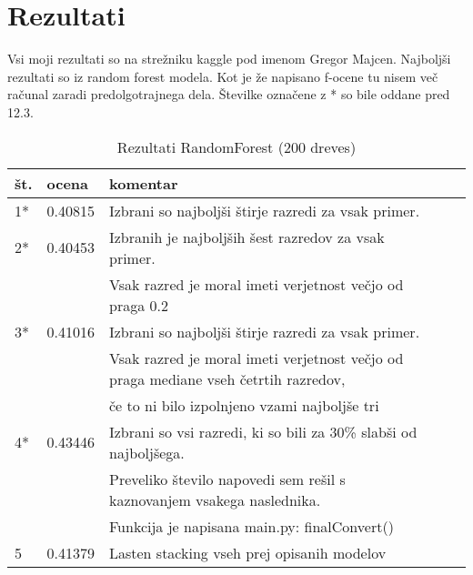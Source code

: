 \documentclass[a4paper,11pt]{article}
\begin{document}
\section{Rezultati}
Vsi moji rezultati so na strežniku kaggle pod imenom Gregor Majcen. Najboljši rezultati so iz random forest modela. Kot je že napisano f-ocene tu nisem več računal zaradi predolgotrajnega dela. Številke označene z * so bile oddane pred 12.3.
\begin{table}[htbp]
\caption{Rezultati RandomForest (200 dreves)}
\label{tab1}
\begin{center}
\begin{tabular}{llllp{10cm}}
\v{s}t. & {ocena} & komentar \\
\hline
1* & 0.40815 & Izbrani so najboljši štirje razredi za vsak primer.\\
2* & 0.40453 & Izbranih je najboljših šest razredov za vsak primer.\\&& Vsak razred je moral imeti verjetnost večjo od praga 0.2\\
3* & 0.41016 & Izbrani so najboljši štirje razredi za vsak primer. \\&& Vsak razred je moral imeti verjetnost večjo od praga mediane vseh četrtih razredov, \\&& če to ni bilo izpolnjeno vzami najboljše tri\\ 
4* & 0.43446 & Izbrani so vsi razredi, ki so bili za 30\% slabši od najboljšega.\\&& Preveliko število napovedi sem rešil s kaznovanjem vsakega naslednika.\\&& Funkcija je napisana main.py: finalConvert()\\
5 & 0.41379 & Lasten stacking vseh prej opisanih modelov\\
\hline
\end{tabular}
\end{center}
\end{table}
\end{document}

